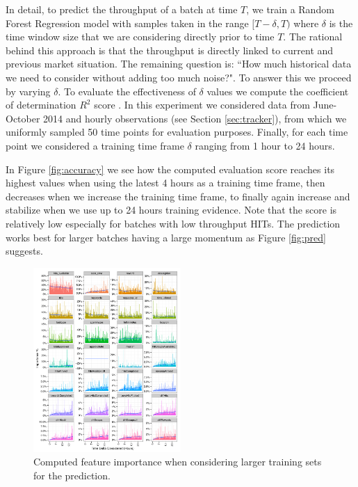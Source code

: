 In detail, to predict the throughput of a batch at time $T$, we train a Random Forest Regression model with samples taken in the range $[T-\delta, T)$ where $\delta$ is the time window size that we are   considering directly prior to time $T$. The rational behind this approach is that the throughput is directly linked to current and previous market situation. 
The remaining question is: ``How much historical data we need to consider without adding too much noise?". To answer this we proceed by varying $\delta$.
To evaluate the effectiveness of $\delta$ values we compute the coefficient of determination  $R^2$ score \cite{sklearnweb, sklearn}.
In this experiment we considered  data from June-October 2014 and hourly observations (see Section \ref{sec:tracker}), from which we uniformly sampled 50 time points for evaluation purposes. Finally, for each time point we considered a training time frame $\delta$ ranging from 1 hour to 24 hours. 

In Figure \ref{fig:accuracy} we see how the computed evaluation score reaches its highest values when using the latest 4 hours as a training time frame, then decreases when we increase the training time frame, to finally again increase and stabilize when we use up to 24 hours training evidence.
Note that the score is relatively low especially for batches with low throughput HITs. The prediction works best for larger batches having a large momentum as Figure \ref{fig:pred} suggests.



\begin{figure}[tb]
	\centering
		\includegraphics[width=0.5\textwidth]{figures/importances}
	\caption{Computed feature importance when considering larger training sets for the prediction.}
	\label{fig:importances}
\end{figure}


